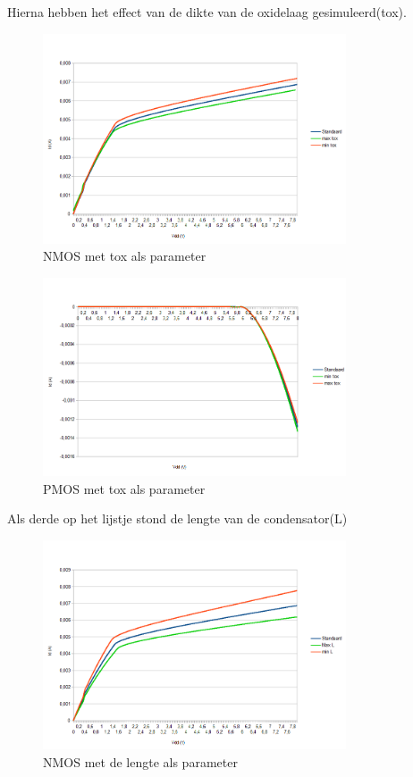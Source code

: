 \documentclass{article}
\begin{document}
Hierna hebben het effect van de dikte van de oxidelaag gesimuleerd(tox).

\begin{figure}[H]
	\centering
	\includegraphics[width=0.8\textwidth]{nmostox}
	\caption{NMOS met tox als parameter}
\end{figure}

\begin{figure}[H]
	\centering
	\includegraphics[width=0.8\textwidth]{pmostox}
	\caption{PMOS met tox als parameter}
\end{figure}

\clearpage
Als derde op het lijstje stond de lengte van de condensator(L)

\begin{figure}[H]
	\centering
	\includegraphics[width=0.8\textwidth]{nmoslengte}
	\caption{NMOS met de lengte als parameter}
\end{figure}
\end{document}
